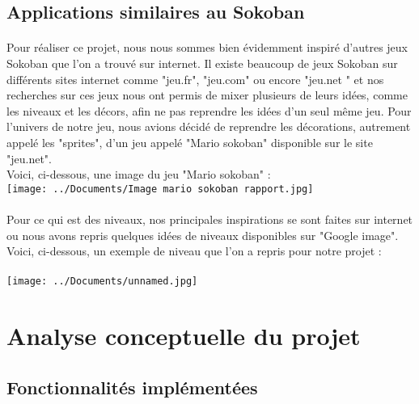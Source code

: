 \documentclass{article}
\begin{document}
\subsection{Applications similaires au Sokoban}

\paragraph{}  Pour réaliser ce projet, nous nous sommes bien évidemment inspiré d'autres jeux Sokoban que l'on a trouvé sur internet. Il existe beaucoup de jeux Sokoban sur différents sites internet comme "jeu.fr", "jeu.com" ou encore "jeu.net " et nos recherches sur ces jeux nous ont permis de mixer plusieurs de leurs idées, comme les niveaux et les décors, afin ne pas reprendre les idées d'un seul même jeu. Pour l'univers de notre jeu, nous avions décidé de reprendre les décorations, autrement appelé les "sprites", d'un jeu appelé "Mario sokoban" disponible sur le site "jeu.net". 
\\Voici, ci-dessous, une image du jeu "Mario sokoban" :
\\
\texttt{[image: ../Documents/Image mario sokoban rapport.jpg]} 
\\
\\Pour ce qui est des niveaux, nos principales inspirations se sont faites sur internet ou nous avons repris quelques idées de niveaux disponibles sur "Google image".
\\Voici, ci-dessous, un exemple de niveau que l'on a repris pour notre projet :
\\
\\
\texttt{[image: ../Documents/unnamed.jpg]} 
\section{Analyse conceptuelle du projet}
\subsection{Fonctionnalités implémentées}
\end{document}
